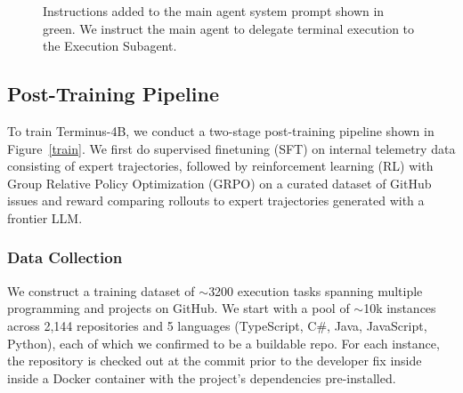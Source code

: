 \documentclass[sigconf,review]{acmart}
\begin{document}
\begin{figure}[t]
\centering
{}
\caption{Instructions added to the main agent system prompt shown in green. We instruct the main agent to delegate terminal execution
to the Execution Subagent.}
\label{main_prompt_diff}
\end{figure}

\subsection{Post-Training Pipeline}
To train Terminus-4B, we conduct a two-stage post-training pipeline shown in Figure~\ref{train}. We first do supervised finetuning (SFT) on internal telemetry data consisting of expert trajectories, followed by reinforcement learning (RL) with Group Relative Policy Optimization (GRPO) on a curated dataset of GitHub issues and reward comparing rollouts to expert trajectories generated with a frontier LLM.

\subsubsection{Data Collection}
\label{data}
We construct a training dataset of $\sim$3200 execution tasks spanning multiple programming and projects on GitHub. We start with a pool of $\sim$10k instances across 2{,}144 repositories and 5 languages (TypeScript, C\#, Java, JavaScript, Python), each of which we confirmed to be a buildable repo. For each instance, the repository is checked out at the commit prior to the developer fix inside inside a Docker container with the project's dependencies pre-installed.
\end{document}
